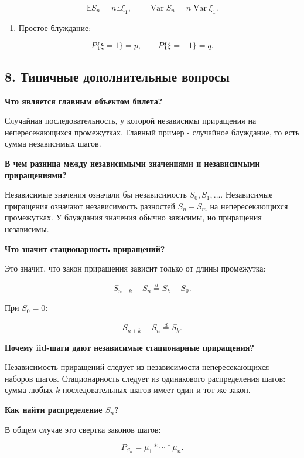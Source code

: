 \documentclass[
  11pt,
  a4paper,
]{article}
\providecommand{\tightlist}{%
  \setlength{\itemsep}{0pt}\setlength{\parskip}{0pt}}
\begin{document}
\[
\mathbb ES_n=n\mathbb E\xi_1,
\qquad
\operatorname{Var}S_n=n\operatorname{Var}\xi_1.
\]

\begin{enumerate}
\def\labelenumi{\arabic{enumi}.}
\setcounter{enumi}{6}
\tightlist
\item
  Простое блуждание:
\end{enumerate}

\[
P\{\xi=1\}=p,
\qquad
P\{\xi=-1\}=q.
\]

\subsection{8. Типичные дополнительные
вопросы}\label{ux442ux438ux43fux438ux447ux43dux44bux435-ux434ux43eux43fux43eux43bux43dux438ux442ux435ux43bux44cux43dux44bux435-ux432ux43eux43fux440ux43eux441ux44b}

\textbf{Что является главным объектом билета?}

Случайная последовательность, у которой независимы приращения на
непересекающихся промежутках. Главный пример - случайное блуждание, то
есть сумма независимых шагов.

\textbf{В чем разница между независимыми значениями и независимыми
приращениями?}

Независимые значения означали бы независимость \(S_0,S_1,\ldots\).
Независимые приращения означают независимость разностей \(S_n-S_m\) на
непересекающихся промежутках. У блуждания значения обычно зависимы, но
приращения независимы.

\textbf{Что значит стационарность приращений?}

Это значит, что закон приращения зависит только от длины промежутка:

\[
S_{n+k}-S_n\stackrel d=S_k-S_0.
\]

При \(S_0=0\):

\[
S_{n+k}-S_n\stackrel d=S_k.
\]

\textbf{Почему iid-шаги дают независимые стационарные приращения?}

Независимость приращений следует из независимости непересекающихся
наборов шагов. Стационарность следует из одинакового распределения
шагов: сумма любых \(k\) последовательных шагов имеет один и тот же
закон.

\textbf{Как найти распределение \(S_n\)?}

В общем случае это свертка законов шагов:

\[
P_{S_n}=\mu_1*\cdots*\mu_n.
\]
\end{document}

